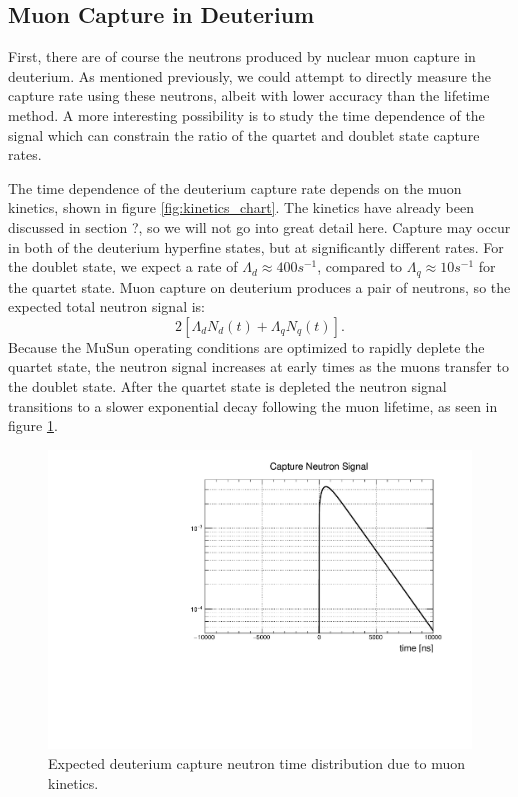 \subsection{Muon Capture in Deuterium}

First, there are of course the neutrons produced by nuclear muon capture in deuterium.
As mentioned previously, we could attempt to directly measure the capture rate using these neutrons, albeit with lower accuracy than the lifetime method.
A more interesting possibility is to study the time dependence of the signal which can constrain the ratio of the quartet and doublet state capture rates.

The time dependence of the deuterium capture rate depends on the muon kinetics, shown in figure \ref{fig:kinetics_chart}.
The kinetics have already been discussed in section ?, so we will not go into great detail here.
Capture may occur in both of the deuterium hyperfine states, but at significantly different rates.
For the doublet state, we expect a rate of $\Lambda_d \approx 400 s^{-1}$, compared to $\Lambda_q \approx 10 s^{-1}$ for the quartet state. 
Muon capture on deuterium produces a pair of neutrons, so the expected total neutron signal is:
\begin{equation}
2[\Lambda_d N_d(t) + \Lambda_q N_q(t)].
\end{equation}
Because the MuSun operating conditions are optimized to rapidly deplete the quartet state, the neutron signal increases at early times as the muons transfer to the doublet state.
After the quartet state is depleted the neutron signal transitions to a slower exponential decay following the muon lifetime, as seen in figure \ref{fig:shape_capture}.

\begin{figure}[h]
  \includegraphics[width=\textwidth]{neutrons/figures/shape_capture.pdf}
  \caption{Expected deuterium capture neutron time distribution due to muon kinetics.}
  \label{fig:shape_capture}
\end{figure}

